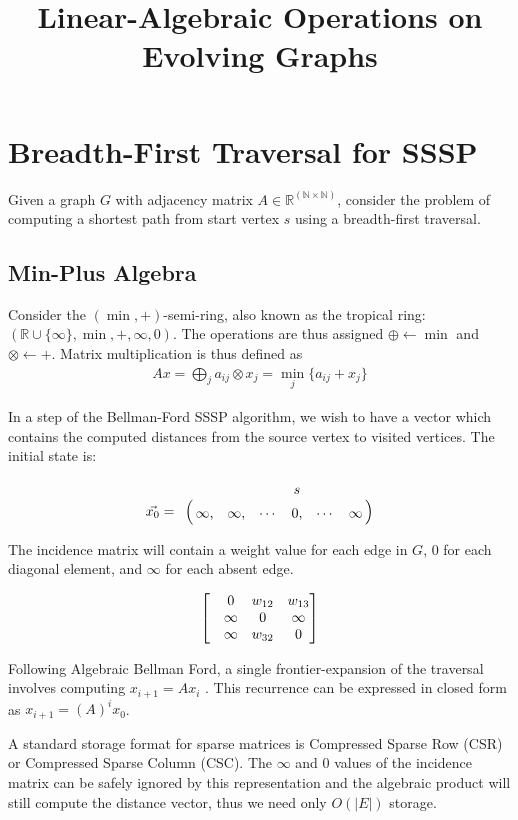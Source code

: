 \documentclass[11pt]{article}
\title{Linear-Algebraic Operations on Evolving Graphs}
\date{}
\begin{document}
\maketitle

\section{Breadth-First Traversal for SSSP}

Given a graph $G$ with adjacency matrix $A \in \mathbb{R^{(N \times N)}}$, consider the problem of computing a shortest path from start vertex $s$ using a breadth-first traversal. 

\subsection{Min-Plus Algebra}
Consider the $(\min,+)$-semi-ring, also known as the tropical ring: $(\mathbb{R} \cup \{\infty\},\min,+,\infty,0)$. The operations are thus assigned $\oplus \gets \min$ and $\otimes \gets +$. Matrix multiplication is thus defined as \begin{align}Ax = \bigoplus_j a_{ij} \otimes x_j = \min_j\{a_{ij}+x_j\}\end{align}

In a step of the Bellman-Ford SSSP algorithm, we wish to have a vector which contains the computed distances from the source vertex to visited vertices. The initial state is:

\begin{align}\vec{x_0} = \bordermatrix{ 
& & & & s&  \cr
& \infty, & \infty, & \cdots & 0,& \cdots &\infty \cr
} \end{align}

The incidence matrix will contain a weight value for each edge in $G$, 0 for each diagonal element, and $\infty$ for each absent edge.

\begin{align}\begin{bmatrix}
& 0 & w_{12} & w_{13}  \cr
& \infty & 0 &  \infty   \cr
& \infty& w_{32} & 0   
\end{bmatrix} \end{align}

Following Algebraic Bellman Ford, a single frontier-expansion of the traversal involves computing $x_{i+1} = Ax_i$ \cite{Gazit198861,citeulike:10648615}. This recurrence can be expressed in closed form as $x_{i+1} = (A)^i x_0$.

A standard storage format for sparse matrices is Compressed Sparse Row (CSR) or Compressed Sparse Column (CSC). The $\infty$ and 0 values of the incidence matrix can be safely ignored by this representation and the algebraic product will still compute the distance vector, thus we need only $O(|E|)$ storage.
\end{document}
